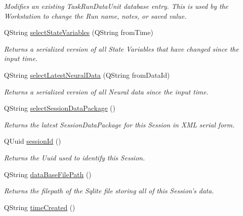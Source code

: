 \begin{DoxyCompactItemize}
\begin{DoxyCompactList}\small\item\em Modifies an existing Task\-Run\-Data\-Unit database entry. This is used by the Workstation to change the Run name, notes, or saved value. \end{DoxyCompactList}\item 
Q\-String \hyperlink{class_session_info_af61711671c1a39e7cc6b817f98cbe33a}{select\-State\-Variables} (Q\-String from\-Time)
\begin{DoxyCompactList}\small\item\em Returns a serialized version of all State Variables that have changed since the input time. \end{DoxyCompactList}\item 
Q\-String \hyperlink{class_session_info_a3c856e16c6c903ac163c7df5f511a52c}{select\-Latest\-Neural\-Data} (Q\-String from\-Data\-Id)
\begin{DoxyCompactList}\small\item\em Returns a serialized version of all Neural data since the input time. \end{DoxyCompactList}\item 
Q\-String \hyperlink{class_session_info_a750b31c4440a6d5cad7de2f8c4e9c863}{select\-Session\-Data\-Package} ()
\begin{DoxyCompactList}\small\item\em Returns the latest Session\-Data\-Package for this Session in X\-M\-L serial form. \end{DoxyCompactList}\item 
\hypertarget{class_session_info_a34f3e6836539e5562c030a2b73316200}{Q\-Uuid \hyperlink{class_session_info_a34f3e6836539e5562c030a2b73316200}{session\-Id} ()}\label{class_session_info_a34f3e6836539e5562c030a2b73316200}

\begin{DoxyCompactList}\small\item\em Returns the Uuid used to identify this Session. \end{DoxyCompactList}\item 
\hypertarget{class_session_info_ac7ff27ee2c53a38f625d9f4c5054999f}{Q\-String \hyperlink{class_session_info_ac7ff27ee2c53a38f625d9f4c5054999f}{data\-Base\-File\-Path} ()}\label{class_session_info_ac7ff27ee2c53a38f625d9f4c5054999f}

\begin{DoxyCompactList}\small\item\em Returns the filepath of the Sqlite file storing all of this Session's data. \end{DoxyCompactList}\item 
\hypertarget{class_session_info_a95110d3f741173fbf776def3b91d4d82}{Q\-String \hyperlink{class_session_info_a95110d3f741173fbf776def3b91d4d82}{time\-Created} ()}\label{class_session_info_a95110d3f741173fbf776def3b91d4d82}


\end{DoxyCompactItemize}
